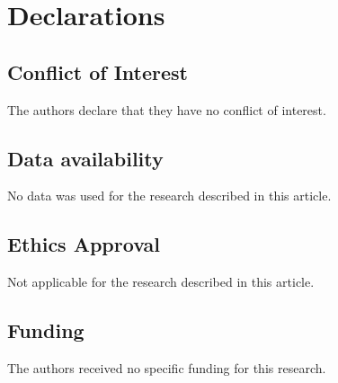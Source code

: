 \documentclass[11pt,oneside,reqno]{amsart}
\theoremstyle{definition}
\theoremstyle{remarkstyle}
\begin{document}
\begin{table}[H]
\begin{tabular}{lll}
\bottomrule
\end{tabular}
\end{table}

\section*{Declarations}
\subsection*{Conflict of Interest} The authors declare that they have no conflict of interest.
\subsection*{Data availability} No data was used for the research described in this article.
\subsection*{Ethics Approval} Not applicable for the research described in this article. 
\subsection*{Funding} The authors received no specific funding for this research.


% 

\end{document}
